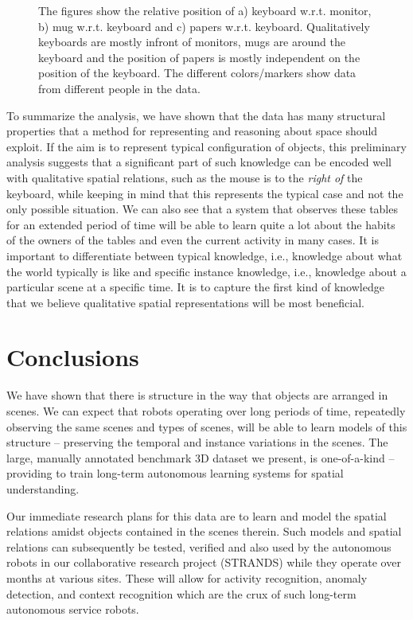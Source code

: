 \documentclass[letterpaper, 10 pt, conference]{ieeeconf}  %
\begin{document}
\begin{figure}[t]
\begin{center}
\end{center}
\caption{The figures show the relative position of a) keyboard w.r.t. monitor, b) mug w.r.t. keyboard and c) papers w.r.t. keyboard. Qualitatively keyboards are mostly infront of monitors, mugs are around the keyboard and the position of papers is mostly independent on the position of the keyboard. The different colors/markers show data from different people in the data.} 
\label{fig:scatter-rest}
\end{figure}

To summarize the analysis, we have shown that the data has many structural 
properties that a method for representing and reasoning about 
space should exploit. If the aim is to represent typical configuration of 
objects, this preliminary analysis suggests that a significant 
part of such knowledge can be encoded well with qualitative spatial 
relations, such as the mouse is to the \textit{right of} the keyboard, while 
keeping in mind that this represents the typical case and not the only 
possible situation. We can also see that a system that observes these tables for 
an extended period of time will be able to learn quite a lot about the 
habits of the owners of the tables and even the current activity in 
many cases. It is important to differentiate between typical knowledge, 
i.e., knowledge about what the world typically is like and specific 
instance knowledge, i.e., knowledge about a particular scene at a specific 
time. It is to capture the first kind of knowledge that we 
believe  qualitative spatial representations will be most beneficial. 

\section{Conclusions}
\label{sec:Conclusions}

We have shown that there is structure in the way that objects are
arranged in scenes.  We can expect that robots operating over long periods 
of time, repeatedly observing the same scenes and types of scenes, 
will be able to learn models of this structure -- preserving the temporal 
and instance variations in the scenes. 
The large, manually annotated benchmark 3D dataset we present, is one-of-a-kind -- 
providing to train long-term autonomous learning systems for spatial understanding.

Our immediate research plans for this data are to learn and model the spatial relations amidst objects contained in the scenes therein. Such models and spatial relations can subsequently be tested, verified and also used by the autonomous robots in our collaborative research project (STRANDS) while they operate over months at various sites.  These will
allow for activity recognition, anomaly detection, and context recognition which are the crux of such long-term autonomous service robots.
\end{document}
